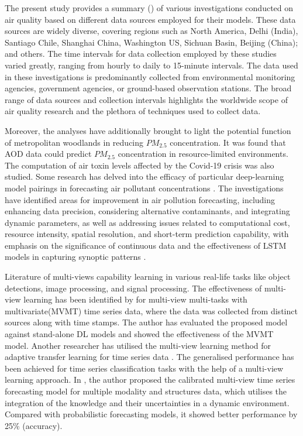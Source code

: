 \par The present study provides a summary () of various investigations conducted on air quality based on different data sources employed for their models. These data sources are widely diverse, covering regions such as North America, Delhi (India), Santiago Chile, Shanghai China, Washington US, Sichuan Basin, Beijing (China); and others. The time intervals for data collection employed by these studies varied greatly, ranging from hourly to daily to 15-minute intervals. The data used in these investigations is predominantly collected from environmental monitoring agencies, government agencies, or ground-based observation stations. The broad range of data sources and collection intervals highlights the worldwide scope of air quality research and the plethora of techniques used to collect data.
\par Moreover,  the analyses have additionally brought to light the potential function of metropolitan woodlands in reducing $PM_{2.5}$ \cite{kumar2022deep} concentration. It was found that AOD data could predict $PM_{2.5}$ concentration in resource-limited environments. The computation of air toxin levels affected by the Covid-19 crisis was also studied. Some research has delved into the efficacy of particular deep-learning model pairings in forecasting air pollutant concentrations \cite{du2019deep}. The investigations have identified areas for improvement in air pollution forecasting,  including enhancing data precision,  considering alternative contaminants,  and integrating dynamic parameters,  as well as addressing issues related to computational cost,  resource intensity,  spatial resolution,  and short-term prediction capability,  with emphasis on the significance of continuous data and the effectiveness of LSTM models in capturing synoptic patterns \cite{ZHANG2022134890}.

\par Literature \cite{YAN2021106, KUMAR2023101959, ZHANG2019158} of multi-views capability learning in various real-life tasks like object detections, image processing, and signal processing. The effectiveness of multi-view learning has been identified by \cite{9935292} for multi-view multi-tasks with multivariate(MVMT) time series data, where the data was collected from distinct sources along with time stamps. The author has evaluated the proposed model against stand-alone DL models and showed the effectiveness of the MVMT model. Another researcher has utilised the multi-view learning method for adaptive transfer learning for time series data \cite{atl2013mts}. The generalised performance has been achieved for time series classification tasks with the help of a multi-view learning approach. In \cite{kamarthi2022camul}, the author proposed the calibrated multi-view time series forecasting model for multiple modality and structures data, which utilises the integration of the knowledge and their uncertainties in a dynamic environment. Compared with probabilistic forecasting models, it showed better performance by 25\% (accuracy).


